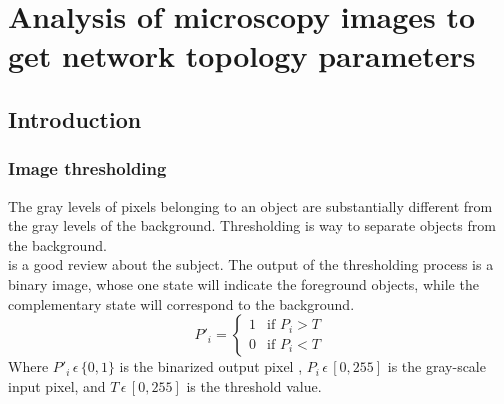 
\chapter{Analysis of microscopy images to get network topology
parameters} %

\label{Chapter-Image} %


\section{Introduction}
\subsection{Image thresholding}
The gray levels of pixels belonging to an object are substantially
different from the gray levels of the background. Thresholding is way to
separate objects from the background.\\
\citet{sezgin_survey_2004} is a good review about the subject. The output of the
thresholding process is a binary image, whose one state will indicate the
foreground objects, while the complementary state will correspond to the
background.\\
\begin{equation}
P'_i=
   \begin{cases} 
     1               & \mbox{if } P_i > T   \\
     0               & \mbox{if } P_i < T
   \end{cases}
   \label{eq:bin}
\end{equation}
Where $P'_i\,\epsilon \, \{0{,} 1\}$ is the binarized output pixel , $P_i\,
\epsilon \,[0{,}255]$ is the gray-scale input pixel, and $T\,
\epsilon \,[0{,}255]$ is the threshold value.\\
  
